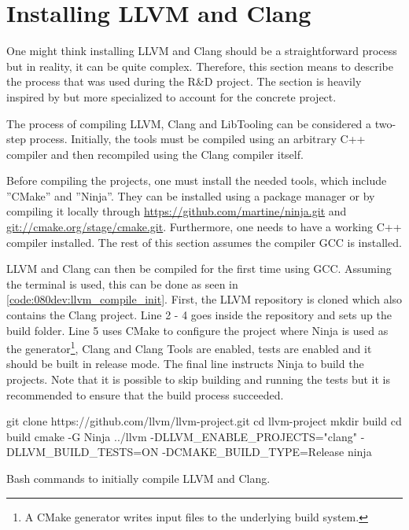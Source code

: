 \section{Installing LLVM and Clang}
One might think installing LLVM and Clang should be a straightforward process but in reality, it can be quite complex. Therefore, this section means to describe the process that was used during the R\&D project. The section is heavily inspired by \cite{clangTutorialBuildingTools} but more specialized to account for the concrete project.

The process of compiling LLVM, Clang and LibTooling can be considered a two-step process. Initially, the tools must be compiled using an arbitrary C++ compiler and then recompiled using the Clang compiler itself.

Before compiling the projects, one must install the needed tools, which include ''CMake'' and ''Ninja''. They can be installed using a package manager or by compiling it locally through \url{https://github.com/martine/ninja.git} and \url{git://cmake.org/stage/cmake.git}. Furthermore, one needs to have a working C++ compiler installed. The rest of this section assumes the compiler GCC is installed.


LLVM and Clang can then be compiled for the first time using GCC. Assuming the terminal is used, this can be done as seen in \cref{code:080dev:llvm_compile_init}.
First, the LLVM repository is cloned which also contains the Clang project.
Line 2 - 4 goes inside the repository and sets up the build folder.
Line 5 uses CMake to configure the project where Ninja is used as the generator\footnote{A CMake generator writes input files to the underlying build system.\cite{cmakeCmakegeneratorsCMake26}}, Clang and Clang Tools are enabled, tests are enabled and it should be built in release mode. The final line instructs Ninja to build the projects. Note that it is possible to skip building and running the tests but it is recommended to ensure that the build process succeeded.

\begin{listing}[H]
    \begin{bashcode}
git clone https://github.com/llvm/llvm-project.git
cd llvm-project
mkdir build
cd build
cmake -G Ninja ../llvm -DLLVM_ENABLE_PROJECTS="clang" -DLLVM_BUILD_TESTS=ON -DCMAKE_BUILD_TYPE=Release
ninja
    \end{bashcode}
    \caption{Bash commands to initially compile LLVM and Clang.}
    \label{code:080dev:llvm_compile_init}
\end{listing}

